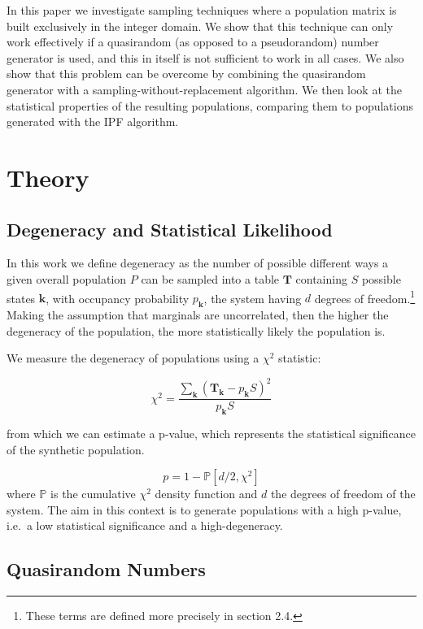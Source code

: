 \documentclass[]{article}
\let\rmarkdownfootnote\footnote%
\def\footnote{\protect\rmarkdownfootnote}
\begin{document}
In this paper we investigate sampling techniques where a population
matrix is built exclusively in the integer domain. We show that this
technique can only work effectively if a quasirandom (as opposed to a
pseudorandom) number generator is used, and this in itself is not
sufficient to work in all cases. We also show that this problem can be
overcome by combining the quasirandom generator with a
sampling-without-replacement algorithm. We then look at the statistical
properties of the resulting populations, comparing them to populations
generated with the IPF algorithm.

\section{Theory}\label{theory}

\subsection{Degeneracy and Statistical
Likelihood}\label{degeneracy-and-statistical-likelihood}

In this work we define degeneracy as the number of possible different
ways a given overall population \(P\) can be sampled into a table
\(\mathbf{T}\) containing \(S\) possible states \(\mathbf{k}\), with
occupancy probability \(p_\mathbf{k}\), the system having \(d\) degrees
of freedom.\footnote{These terms are defined more precisely in section
  2.4.} Making the assumption that marginals are uncorrelated, then the
higher the degeneracy of the population, the more statistically likely
the population is.

We measure the degeneracy of populations using a \(\chi^2\) statistic:

\[\chi^2 = \frac{\sum\limits_{\mathbf{k}}(\mathbf{T}_\mathbf{k}-p_\mathbf{k}S)^2}{p_\mathbf{k}S}\]

from which we can estimate a p-value, which represents the statistical
significance of the synthetic population.

\[p=1-\mathbb{P}[d/2,\chi^2]\] where \(\mathbb{P}\) is the cumulative
\(\chi^2\) density function and \(d\) the degrees of freedom of the
system. The aim in this context is to generate populations with a high
p-value, i.e.~a low statistical significance and a high-degeneracy.

\subsection{Quasirandom Numbers}\label{quasirandom-numbers}
\end{document}
